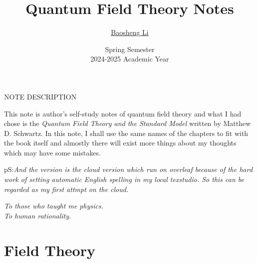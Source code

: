 \documentclass[12pt,openany]{book}
\title{Quantum Field Theory Notes}
\author[1]{\href{libaosheng@stu.ynu.edu.cn}{Baosheng Li}  }
\affil[1]{School of Physics and Astronomy, Yunnan University}
\date{Spring Semester\\2024-2025 Academic Year}
\begin{document}
	\frontmatter
	
	\maketitle
	\begin{center}
		NOTE DESCRIPTION 
	\end{center}
	
	This note is author's self-study notes of quantum field theory and what I had chose is the \textit{Quantum Field Theory and the Standard Model} written by Matthew D. Schwartz. 
	In this note, I shall use the same names of the chapters to fit with the book itself and almostly there will exist more things about my thoughts which may have some mistakes.\par 
	pS:\textit{And the version is the cloud version which run on overleaf because of the hard work of setting 
		automatic English spelling in my local texstudio. So this can be regarded as my first attmpt on the 
		cloud.}
	
	
	\clearpage
	\vspace*{\fill}
	\begin{center}
		\textit{To those who taught me physics.}\\
		\textit{To human rationality.}
	\end{center}
	\vspace*{\fill}
	\clearpage
	
	\tableofcontents
	
	\mainmatter
	\part{Field Theory}
\end{document}
